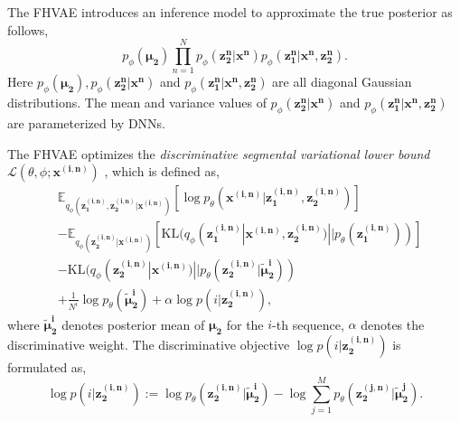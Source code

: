 \documentclass[transmag]{IEEEtran}
\begin{document}
The FHVAE introduces an inference model
to approximate the true posterior as follows,
\begin{equation}
   p_{\phi} (\bm{\mu_2})\prod_{n=1}^{N}p_{\phi} (\bm{z_2^n}| \bm{x^n}) p_{\phi}(\bm{z_1^n}|\bm{x^n}, \bm{z_2^n}).
   \label{eqt:inference}
\end{equation}
Here  $p_{\phi} (\bm{\mu_2}), p_{\phi} (\bm{z_2^n}| \bm{x^n})$ and $p_{\phi}(\bm{z_1^n}|\bm{x^n}, \bm{z_2^n})$ are all diagonal Gaussian distributions. 
The mean and variance values of $p_{\phi} (\bm{z_2^n}| \bm{x^n})$ and $p_{\phi}(\bm{z_1^n}|\bm{x^n}, \bm{z_2^n})$ are parameterized by   DNNs. 

The FHVAE optimizes the  \textit{discriminative segmental variational lower bound} $\mathcal{L} (\theta, \phi; \bm{x^{(i,n)}})$ \cite{hsu2017nips}, which is  defined as,
\begin{equation}
\begin{split}
&\mathbb{E}_{q_{\phi} (\bm{z_1^{(i,n)}},\bm{z_2^{(i,n)}}|\bm{x^{(i,n)}} )} [\log p_{\theta} (\bm{x^{(i,n)}}|\bm{z_1^{(i,n)}}, \bm{z_2^{(i,n)}})]\\
&-\mathbb{E}_{q_{\phi}(\bm{z_2^{(i,n)}} |\bm{x^{(i,n)}} )} [\mathrm{KL} (q_{\phi} (\bm{z_1^{(i,n)}}|\bm{x^{(i,n)}}, \bm{z_2^{(i,n)}})||p_{\theta} (\bm{z_1^{(i,n)}}))]\\
&-\mathrm{KL} (q_{\phi}(\bm{z_2 ^{(i,n)}}|\bm{x^{(i,n)}})|| p_{\theta}(\bm{z_2 ^{(i,n)}}| \bm{\tilde{\mu}_2^i})) \\
&+\frac{1}{N^i}\log p_{\theta} (\bm{\tilde{\mu}_2^i}) + \alpha \log p(i| \bm{z_2^{(i,n)}}),
\end{split}
\label{eqt:supple_fhvae_obj_function}
\end{equation}
where $\bm{\tilde{\mu}_2^{i}}$ denotes posterior mean of $\bm{\mu_2}$ for the $i$-th sequence, $\alpha$ denotes the  discriminative weight. The discriminative objective $\log p(i| \bm{z_2^{(i,n)}}) $ is formulated as,
\begin{equation}
    \log p(i| \bm{z_2^{(i,n)}}) := \log p_{\theta} (\bm{z_2^{(i,n)}}| \bm{\tilde{\mu}_2^i})-\log \sum_{j=1}^{M}p_{\theta} (\bm{z_2^{(j,n)}}| \bm{\tilde{\mu}_2^j}).
\end{equation}
\end{document}
